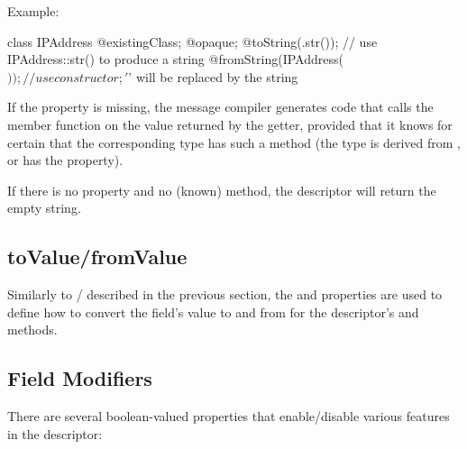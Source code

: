 Example:

\begin{msg}
class IPAddress
{
    @existingClass;
    @opaque;
    @toString(.str());  // use IPAddress::str() to produce a string
    @fromString(IPAddress($));  // use constructor; '$' will be replaced by the string
}
\end{msg}

If the  property is missing, the message compiler generates
code that calls the  member function on the value returned by the
getter, provided that it knows for certain that the corresponding type has such
a method (the type is derived from , or has the 
property).

If there is no  property and no (known)  method,
the descriptor will return the empty string.


\subsection{toValue/fromValue}
\label{sec:msg-defs:descriptor-tovalue}

Similarly to / described in the previous
section, the  and  properties are used to
define how to convert the field's value to and from  for the
descriptor's  and  methods.


\subsection{Field Modifiers}
\label{sec:msg-defs:descriptor-fieldmodifiers}

There are several boolean-valued properties that enable/disable various features
in the descriptor:

